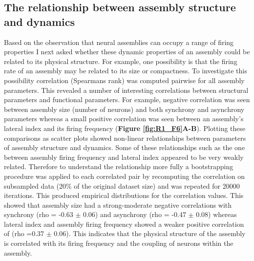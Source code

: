 \subsection{The relationship between assembly structure and dynamics}
Based on the observation that neural assemblies can occupy a range of firing properties I next asked whether these dynamic properties of an assembly could be related to its physical structure. For example, one possibility is that the firing rate of an assembly may be related to its size or compactness. To investigate this possibility correlation (Spearmans rank) was computed pairwise for all assembly parameters. This revealed a number of interesting correlations between structural parameters and  functional parameters. For example, negative correlation was seen between assembly size (number of neurons) and both synchrony and asynchrony parameters whereas a small positive correlation was seen between an assembly's lateral index and its firing frequency (\textbf{Figure \ref{fig:R1_F6}A-B}). Plotting these comparisons as scatter plots showed non-linear relationships between parameters of assembly structure and dynamics. Some of these relationships such as the one between assembly firing frequency and lateral index appeared to be very weakly related. Therefore to understand the relationship more fully a bootstrapping procedure was applied to each correlated pair by recomputing the correlation on subsampled data (20\% of the original dataset size) and was repeated for 20000 iterations. This produced empirical distributions for the correlation values. This showed that assembly size had a strong-moderate negative correlations with synchrony (rho = -0.63 $\pm$ 0.06) and asynchrony (rho = -0.47 $\pm$ 0.08) whereas lateral index and assembly firing frequency showed a weaker positive correlation of (rho =0.37 $\pm$ 0.06). This indicates that the physical structure of the assembly is correlated with its firing frequency and the coupling of neurons within the assembly. 


